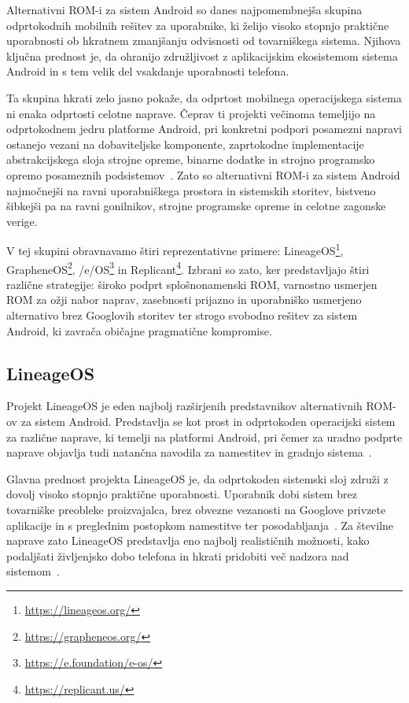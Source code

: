 \documentclass[a4paper,12pt,openright]{book}
\begin{document}
Alternativni ROM-i za sistem Android so danes najpomembnejša skupina odprtokodnih mobilnih rešitev za uporabnike, ki želijo visoko stopnjo praktične uporabnosti ob hkratnem zmanjšanju odvisnosti od tovarniškega sistema.
Njihova ključna prednost je, da ohranijo združljivost z aplikacijskim ekosistemom sistema Android in s tem velik del vsakdanje uporabnosti telefona.

Ta skupina hkrati zelo jasno pokaže, da odprtost mobilnega operacijskega sistema ni enaka odprtosti celotne naprave.
Čeprav ti projekti večinoma temeljijo na odprtokodnem jedru platforme Android, pri konkretni podpori posamezni napravi ostanejo vezani na dobaviteljske komponente, zaprtokodne implementacije abstrakcijskega sloja strojne opreme, binarne dodatke in strojno programsko opremo posameznih podsistemov~\cite{aosp_get_started_2025,android_treble_vendor_system_split,android_hidl_versioning_treble}.
Zato so alternativni ROM-i za sistem Android najmočnejši na ravni uporabniškega prostora in sistemskih storitev, bistveno šibkejši pa na ravni gonilnikov, strojne programske opreme in celotne zagonske verige.

V tej skupini obravnavamo štiri reprezentativne primere: LineageOS\footnote{\url{https://lineageos.org/}}, GrapheneOS\footnote{\url{https://grapheneos.org/}}, /e/OS\footnote{\url{https://e.foundation/e-os/}} in Replicant\footnote{\url{https://replicant.us/}}.
Izbrani so zato, ker predstavljajo štiri različne strategije:
široko podprt splošnonamenski ROM,
varnostno usmerjen ROM za ožji nabor naprav,
zasebnosti prijazno in uporabniško usmerjeno alternativo brez Googlovih storitev
ter strogo svobodno rešitev za sistem Android, ki zavrača običajne pragmatične kompromise.

\subsection{LineageOS}

Projekt LineageOS je eden najbolj razširjenih predstavnikov alternativnih ROM-ov za sistem Android.
Predstavlja se kot prost in odprtokoden operacijski sistem za različne naprave, ki temelji na platformi Android, pri čemer za uradno podprte naprave objavlja tudi natančna navodila za namestitev in gradnjo sistema~\cite{lineageos_home,lineageos_devices}.

Glavna prednost projekta LineageOS je, da odprtokoden sistemski sloj združi z dovolj visoko stopnjo praktične uporabnosti.
Uporabnik dobi sistem brez tovarniške preobleke proizvajalca, brez obvezne vezanosti na Googlove privzete aplikacije in s preglednim postopkom namestitve ter posodabljanja~\cite{lineageos_gapps}.
Za številne naprave zato LineageOS predstavlja eno najbolj realističnih možnosti, kako podaljšati življenjsko dobo telefona in hkrati pridobiti več nadzora nad sistemom~\cite{bradley_sustainable_security_2023}.
\end{document}
